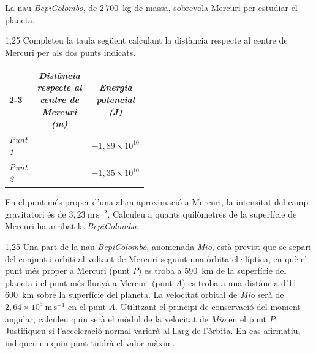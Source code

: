 La nau \textit{BepiColombo}, de 2\,700~kg de massa, sobrevola Mercuri per estudiar el planeta.

\begin{apartat}{1,25}
Completeu la taula següent calculant la distància respecte al centre de Mercuri per als dos punts indicats.

\begin{center}
\begin{tabular}{|l|p{0.45\linewidth}|c|}
\cline{2-3}
\multicolumn{1}{c|}{} & \multicolumn{1}{c|}{\textit{Distància respecte al centre de Mercuri (m)}} & \textit{Energia potencial (J)} \\
\hline
\rule{0pt}{3.5ex}\textit{Punt 1} & & $-1,89\times 10^{10}$ \\[1.5ex]
\hline
\rule{0pt}{3.5ex}\textit{Punt 2} & & $-1,35\times 10^{10}$ \\[1.5ex]
\hline
\end{tabular}
\end{center}

En el punt més proper d'una altra aproximació a Mercuri, la intensitat del camp gravitatori és de $3,23\ \mathrm{m\,s^{-2}}$. Calculeu a quants quilòmetres de la superfície de Mercuri ha arribat la \textit{BepiColombo}.
\end{apartat}

\begin{apartat}{1,25}
Una part de la nau \textit{BepiColombo}, anomenada \textit{Mio}, està previst que se separi del conjunt i orbiti al voltant de Mercuri seguint una òrbita el·líptica, en què el punt més proper a Mercuri (punt $P$) es troba a 590~km de la superfície del planeta i el punt més llunyà a Mercuri (punt $A$) es troba a una distància d'11\,600~km sobre la superfície del planeta. La velocitat orbital de \textit{Mio} serà de $2,64\times 10^{3}\ \mathrm{m\,s^{-1}}$ en el punt $A$. Utilitzant el principi de conservació del moment angular, calculeu quin serà el mòdul de la velocitat de \textit{Mio} en el punt $P$. Justifiqueu si l'acceleració normal variarà al llarg de l'òrbita. En cas afirmatiu, indiqueu en quin punt tindrà el valor màxim.
\end{apartat}

